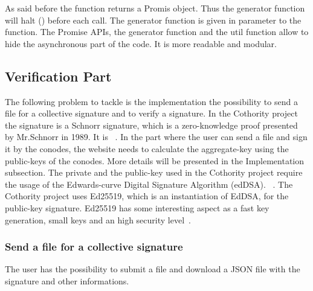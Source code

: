 \documentclass[11pt, a4paper, twoside, openright, openany]{article} %
\begin{document}
As said before the  function returns a Promis object.
Thus the generator function  will halt () before each
 call.
\newline
The generator function is given in parameter to the  function.
\newline
The Promise APIs, the generator function and the util function  allow
to hide the asynchronous part of the code. It is more readable and modular.
\bigbreak


\subsection{Verification Part}
The following problem to tackle is the implementation the possibility to send a
file for a collective signature and to verify a signature.
\newline
In the Cothority project the signature is a Schnorr signature, which is a zero-knowledge proof presented
by Mr.Schnorr in 1989. It is ~\cite{wikiSchnorr}.
\newline
In the part where the user can send a file and sign it by the conodes,
the website needs to calculate the aggregate-key using the public-keys of the conodes.
More details will be presented in the Implementation subsection.
\newline
The private and the public-key used in the Cothority project require the usage of
the Edwards-curve Digital Signature Algorithm (edDSA).
~\cite{edDSA}.
The Cothority project uses Ed25519, which is an instantiation of EdDSA, for the
public-key signature. Ed25519 has some interesting aspect as a fast key generation,
small keys and an high security level~\cite{ed25519}.
\bigbreak

\subsubsection{Send a file for a collective signature}
The user has the possibility to submit a file and download a JSON file with the
signature and other informations.
\bigbreak
\end{document}
